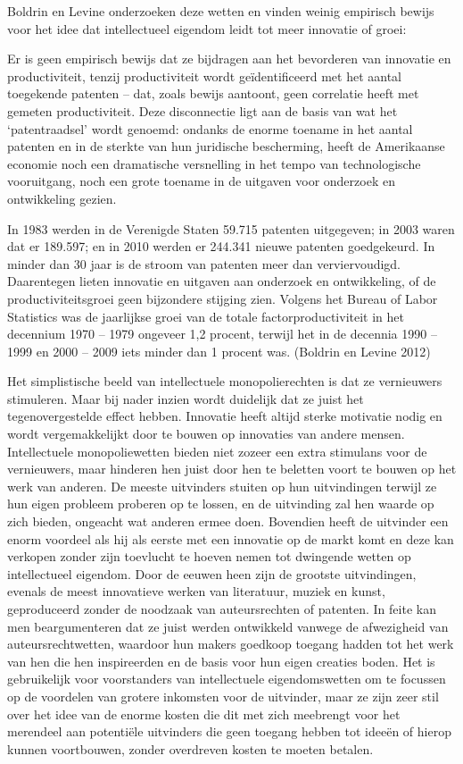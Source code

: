 \documentclass[
  a5paper,
  smalldemyvopaper,11pt,twoside,onecolumn,openright,extrafontsizes,
hidelinks]{memoir}
\begin{document}
Boldrin en Levine onderzoeken deze wetten en vinden weinig empirisch
bewijs voor het idee dat intellectueel eigendom leidt tot meer innovatie
of groei:

Er is geen empirisch bewijs dat ze bijdragen aan het bevorderen van
innovatie en productiviteit, tenzij productiviteit wordt geïdentificeerd
met het aantal toegekende patenten -- dat, zoals bewijs aantoont, geen
correlatie heeft met gemeten productiviteit. Deze disconnectie ligt aan
de basis van wat het `patentraadsel' wordt genoemd: ondanks de enorme
toename in het aantal patenten en in de sterkte van hun juridische
bescherming, heeft de Amerikaanse economie noch een dramatische
versnelling in het tempo van technologische vooruitgang, noch een grote
toename in de uitgaven voor onderzoek en ontwikkeling gezien.

In 1983 werden in de Verenigde Staten 59.715 patenten uitgegeven; in
2003 waren dat er 189.597; en in 2010 werden er 244.341 nieuwe patenten
goedgekeurd. In minder dan 30 jaar is de stroom van patenten meer dan
verviervoudigd. Daarentegen lieten innovatie en uitgaven aan onderzoek
en ontwikkeling, of de productiviteitsgroei geen bijzondere stijging
zien. Volgens het Bureau of Labor Statistics was de jaarlijkse groei van
de totale factorproductiviteit in het decennium 1970 -- 1979 ongeveer
1,2 procent, terwijl het in de decennia 1990 -- 1999 en 2000 -- 2009
iets minder dan 1 procent was. (Boldrin en Levine 2012)

Het simplistische beeld van intellectuele monopolierechten is dat ze
vernieuwers stimuleren. Maar bij nader inzien wordt duidelijk dat ze
juist het tegenovergestelde effect hebben. Innovatie heeft altijd sterke
motivatie nodig en wordt vergemakkelijkt door te bouwen op innovaties
van andere mensen. Intellectuele monopoliewetten bieden niet zozeer een
extra stimulans voor de vernieuwers, maar hinderen hen juist door hen te
beletten voort te bouwen op het werk van anderen. De meeste uitvinders
stuiten op hun uitvindingen terwijl ze hun eigen probleem proberen op te
lossen, en de uitvinding zal hen waarde op zich bieden, ongeacht wat
anderen ermee doen. Bovendien heeft de uitvinder een enorm voordeel als
hij als eerste met een innovatie op de markt komt en deze kan verkopen
zonder zijn toevlucht te hoeven nemen tot dwingende wetten op
intellectueel eigendom. Door de eeuwen heen zijn de grootste
uitvindingen, evenals de meest innovatieve werken van literatuur, muziek
en kunst, geproduceerd zonder de noodzaak van auteursrechten of
patenten. In feite kan men beargumenteren dat ze juist werden ontwikkeld
vanwege de afwezigheid van auteursrechtwetten, waardoor hun makers
goedkoop toegang hadden tot het werk van hen die hen inspireerden en de
basis voor hun eigen creaties boden. Het is gebruikelijk voor
voorstanders van intellectuele eigendomswetten om te focussen op de
voordelen van grotere inkomsten voor de uitvinder, maar ze zijn zeer
stil over het idee van de enorme kosten die dit met zich meebrengt voor
het merendeel aan potentiële uitvinders die geen toegang hebben tot
ideeën of hierop kunnen voortbouwen, zonder overdreven kosten te moeten
betalen.
\end{document}
